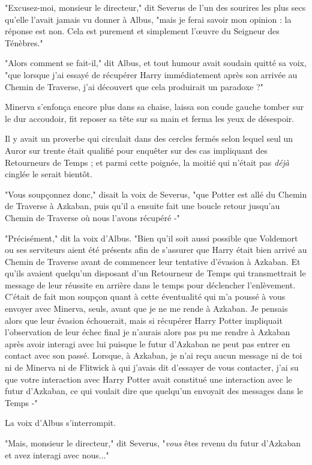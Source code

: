 "Excusez-moi, monsieur le directeur," dit Severus de l'un des sourires les plus secs qu'elle l'avait jamais vu donner à Albus, "mais je ferai savoir mon opinion : la réponse est non. Cela est purement et simplement l'œuvre du Seigneur des Ténèbres."

"Alors comment se fait-il," dit Albus, et tout humour avait soudain quitté sa voix, "que lorsque j'ai essayé de récupérer Harry immédiatement après son arrivée au Chemin de Traverse, j'ai découvert que cela produirait un paradoxe ?"

Minerva s'enfonça encore plus dans sa chaise, laissa son coude gauche tomber sur le dur accoudoir, fit reposer sa tête sur sa main et ferma les yeux de désespoir.

Il y avait un proverbe qui circulait dans des cercles fermés selon lequel seul un Auror sur trente était qualifié pour enquêter sur des cas impliquant des Retourneurs de Temps ; et parmi cette poignée, la moitié qui n'était pas \emph{déjà}  cinglée le serait bientôt.

"Vous soupçonnez donc," disait la voix de Severus, "que Potter est allé du Chemin de Traverse à Azkaban, puis qu'il a ensuite fait une boucle retour jusqu'au Chemin de Traverse où nous l'avons récupéré -"

"Précisément," dit la voix d'Albus. "Bien qu'il soit aussi possible que Voldemort ou ses serviteurs aient été présents afin de s'assurer que Harry était bien arrivé au Chemin de Traverse avant de commencer leur tentative d'évasion à Azkaban. Et qu'ils avaient quelqu'un disposant d'un Retourneur de Temps qui transmettrait le message de leur réussite en arrière dans le temps pour déclencher l'enlèvement. C'était de fait mon soupçon quant à cette éventualité qui m'a poussé à vous envoyer avec Minerva, seuls, avant que je ne me rende à Azkaban. Je pensais alors que leur évasion échouerait, mais si récupérer Harry Potter impliquait l'observation de leur échec final je n'aurais alors pas pu me rendre à Azkaban après avoir interagi avec lui puisque le futur d'Azkaban ne peut pas entrer en contact avec son passé. Lorsque, à Azkaban, je n'ai reçu aucun message ni de toi ni de Minerva ni de Flitwick à qui j'avais dit d'essayer de vous contacter, j'ai su que votre interaction avec Harry Potter avait constitué une interaction avec le futur d'Azkaban, ce qui voulait dire que quelqu'un envoyait des messages dans le Temps -"

La voix d'Albus s'interrompit.

"Mais, monsieur le directeur," dit Severus, "\emph{vous}  êtes revenu du futur d'Azkaban et avez interagi avec nous..."

